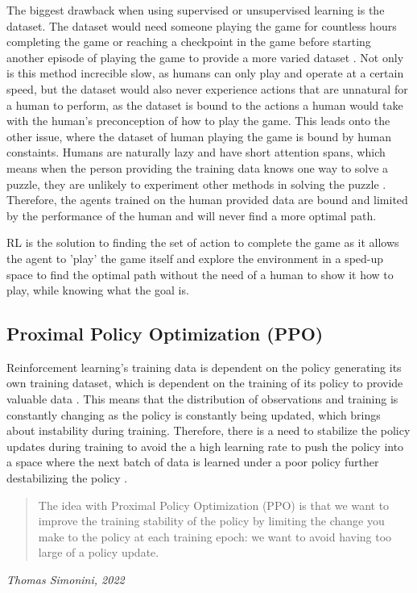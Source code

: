 The biggest drawback when using supervised or unsupervised learning is the dataset. The dataset would need someone playing the game for countless hours completing the game or reaching a checkpoint in the game before starting another episode of playing the game to provide a more varied dataset \cite{XanderSteenbrugge2019intro}. Not only is this method increcible slow, as humans can only play and operate at a certain speed, but the dataset would also never experience actions that are unnatural for a human to perform, as the dataset is bound to the actions a human would take with the human's preconception of how to play the game. This leads onto the other issue, where the dataset of human playing the game is bound by human constaints. Humans are naturally lazy and have short attention spans, which means when the person providing the training data knows one way to solve a puzzle, they are unlikely to experiment other methods in solving the puzzle \cite{XanderSteenbrugge2019intro}. Therefore, the agents trained on the human provided data are bound and limited by the performance of the human and will never find a more optimal path. 

RL is the solution to finding the set of action to complete the game as it allows the agent to 'play' the game itself and explore the environment in a sped-up space to find the optimal path without the need of a human to show it how to play, while knowing what the goal is. 

\subsection{Proximal Policy Optimization (PPO)}

Reinforcement learning's training data is dependent on the policy generating its own training dataset, which is dependent on the training of its policy to provide valuable data \cite{XanderSteenbrugge2019ppo}. This means that the distribution of observations and training is constantly changing as the policy is constantly being updated, which brings about instability during training. Therefore, there is a need to stabilize the policy updates during training to avoid the a high learning rate to push the policy into a space where the next batch of data is learned under a poor policy further destabilizing the policy \cite{XanderSteenbrugge2019ppo}.

\begin{quote}
    The idea with Proximal Policy Optimization (PPO) is that we want to improve the training stability of the policy by limiting the change you make to the policy at each training epoch: we want to avoid having too large of a policy update.
    \end{quote}
    \hspace*{\fill} \textit{Thomas Simonini, 2022}

